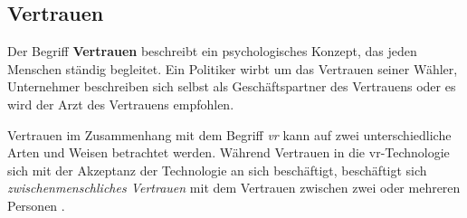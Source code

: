 \documentclass[a4paper,11pt]{article}%
\renewcommand{\\}{\vspace*{0.5\baselineskip} \newline}
\begin{document}

%	

\newpage

\subsection{Vertrauen}
\label{Vertrauen}
Der Begriff \textbf{Vertrauen} beschreibt ein psychologisches Konzept, das jeden Menschen ständig begleitet.
Ein Politiker wirbt um das Vertrauen seiner Wähler, Unternehmer beschreiben sich selbst als \glqq{}Geschäftspartner des Vertrauens\grqq{} oder es wird der \glqq{}Arzt des Vertrauens\dq{} empfohlen.

Vertrauen im Zusammenhang mit dem Begriff \textit{\ac{vr}} kann auf zwei unterschiedliche Arten und Weisen betrachtet werden. 
Während Vertrauen in die \ac{vr}-Technologie sich mit der Akzeptanz der Technologie an sich beschäftigt, beschäftigt sich \textit{zwischenmenschliches Vertrauen} mit dem Vertrauen zwischen zwei oder mehreren Personen \citep{mcknight2011trust}.
\end{document}
